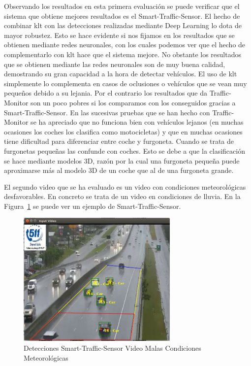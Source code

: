 Observando los resultados en esta primera evaluación se puede verificar que el sistema que obtiene mejores resultados es el Smart-Traffic-Sensor. El hecho de combinar \acrshort{klt} con las detecciones realizadas mediante Deep Learning lo dota de mayor robustez. Esto se hace evidente si nos fijamos en los resultados que se obtienen mediante redes neuronales, con los cuales podemos ver que el hecho de complementarlo con \acrshort{klt} hace que el sistema mejore. No obstante los resultados que se obtienen mediante las redes neuronales son de muy buena calidad, demostrando su gran capacidad a la hora de detectar vehículos. El uso de \acrshort{klt} simplemente lo complementa en casos de oclusiones o vehículos que se vean muy pequeños debido a su lejania. Por el contrario los resultados que da Traffic-Monitor son un poco pobres si los comparamos con los conseguidos gracias a Smart-Traffic-Sensor. En las sucesivas pruebas que se han hecho con Traffic-Monitor se ha apreciado que no funciona bien con vehículos lejanos (en muchas ocasiones los coches los clasifica como motocicletas) y que en muchas ocasiones tiene dificultad para diferenciar entre coche y furgoneta. Cuando se trata de furgonetas pequeñas las confunde con coches. Esto se debe a que la clasificación se hace mediante modelos 3D, razón por la cual una furgoneta pequeña puede aproximarse más al modelo 3D de un coche que al de una furgoneta grande.


El segundo video que se ha evaluado es un video con condiciones meteorológicas desfavorables. En concreto se trata de un video en condiciones de lluvia. En la Figura~\ref{fig.video_malas_condiciones} se puede ver un ejemplo de Smart-Traffic-Sensor.

\begin{figure}[H] 
\begin{center}
	\includegraphics[width=0.7\textwidth]{figures/Experimentos/sts_malas_condiciones.png}
   \caption{Detecciones Smart-Traffic-Sensor Video Malas Condiciones Meteorológicas}
	\label{fig.video_malas_condiciones}
\end{center}
\end{figure}

